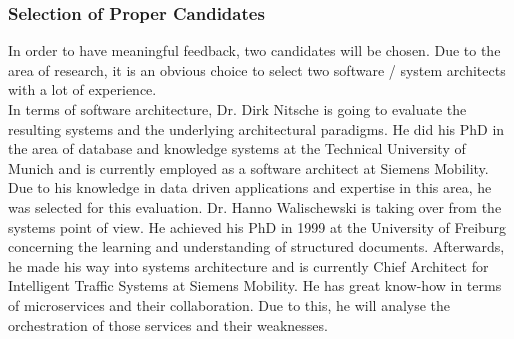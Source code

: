 \subsubsection{Selection of Proper Candidates}
In order to have meaningful feedback, two candidates will be chosen. Due to the area of research, it is an obvious choice to select two software / system architects with a lot of experience.\newline
\\
In terms of software architecture, Dr. Dirk Nitsche is going to evaluate the resulting systems and the underlying architectural paradigms. He did his PhD in the area of database and knowledge systems at the Technical University of Munich and is currently employed as a software architect at Siemens Mobility. Due to his knowledge in data driven applications and expertise in this area, he was selected for this evaluation.\newline
Dr. Hanno Walischewski is taking over from the systems point of view. He achieved his PhD in 1999 at the University of Freiburg concerning the learning and understanding of structured documents. Afterwards, he made his way into systems architecture and is currently Chief Architect for Intelligent Traffic Systems at Siemens Mobility. He has great know-how in terms of microservices and their collaboration. Due to this, he will analyse the orchestration of those services and their weaknesses.

\newpage

